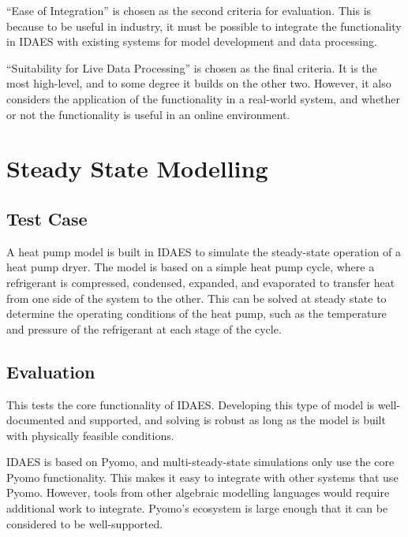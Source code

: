 \documentclass[12pt]{article}
\begin{document}
``Ease of Integration'' is chosen as the second criteria for evaluation. This is because to be useful in industry, it must be possible to integrate the functionality in IDAES with existing systems for model development and data processing.

``Suitability for Live Data Processing'' is chosen as the final criteria. It is the most high-level, and to some degree it builds on the other two. However, it also considers the application of the functionality in a real-world system, and whether or not the functionality is useful in an online environment.

\section{Steady State Modelling}


\subsection{Test Case}

A heat pump model is built in IDAES to simulate the steady-state operation of a heat pump dryer. The model is based on a simple heat pump cycle, where a refrigerant is compressed, condensed, expanded, and evaporated to transfer heat from one side of the system to the other. This can be solved at steady state to determine the operating conditions of the heat pump, such as the temperature and pressure of the refrigerant at each stage of the cycle.


\subsection{Evaluation}

This tests the core functionality of IDAES. Developing this type of model is well-documented and supported, and solving is robust as long as the model is built with physically feasible conditions.

IDAES is based on Pyomo, and multi-steady-state simulations only use the core Pyomo functionality. This makes it easy to integrate with other systems that use Pyomo. However, tools from other algebraic modelling languages would require additional work to integrate. Pyomo's ecosystem is large enough that it can be considered to be well-supported.
\end{document}
